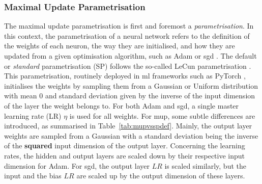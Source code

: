 \subsubsection{Maximal Update Parametrisation}
The maximal update parametrisation is first and foremost a \textit{parametrisation}. In this context, the parametrisation of a neural network refers to the definition of the weights of each neuron, the way they are initialised, and how they are updated from a given optimisation algorithm, such as Adam or \gls{sgd} \cite{adamPaper}. The default or \textit{standard} parametrisation (SP) follows the so-called LeCun parametrisation \cite{LeCun2012}. This parametrisation, routinely deployed in \gls{ml} frameworks such as PyTorch \cite{pytorch}, initialises the weights by sampling them from a Gaussian or Uniform distribution with mean 0 and standard deviation given by the inverse of the input dimension of the layer the weight belongs to. For both Adam and \gls{sgd}, a single master learning rate (LR) $\eta$ is used for all weights. For \gls{mup}, some subtle differences are introduced, as summarised in Table~\ref{tab:mupvsspdef}. Mainly, the output layer weights are sampled from a Gaussian with a standard deviation being the inverse of the \textbf{squared} input dimension of the output layer. Concerning the learning rates, the hidden and output layers are scaled down by their respective input dimension for Adam. For \gls{sgd}, the output layer $LR$ is scaled similarly, but the input and the bias $LR$ are scaled up by the output dimension of these layers. 

